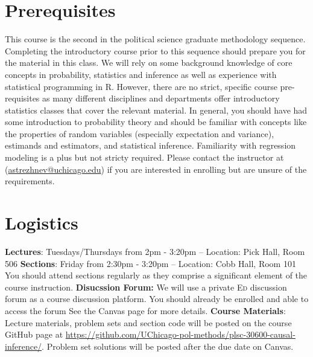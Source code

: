 \documentclass[11pt, article, oneside]{memoir}
\theoremstyle{Assumption}
\begin{document}
\section*{Prerequisites}

This course is the second in the political science graduate methodology sequence. Completing the introductory course prior to this sequence should prepare you for the material in this class. We will rely on some background knowledge of core concepts in probability, statistics and inference as well as experience with statistical programming in R. However, there are no strict, specific course pre-requisites as many different disciplines and departments offer introductory statistics classes that cover the relevant material. In general, you should have had some introduction to probability theory and should be familiar with concepts like the properties of random variables (especially expectation and variance), estimands and estimators, and statistical inference. Familiarity with regression modeling is a plus but not stricty required. Please contact the instructor at (\href{mailto:astrezhnev@uchicago.edu}{astrezhnev@uchicago.edu}) if you are interested in enrolling but are unsure of the requirements. 

\section*{Logistics}

\textbf{Lectures}: Tuesdays/Thursdays from 2pm - 3:20pm -- Location: Pick Hall, Room 506
\newline\textbf{Sections}: Friday from 2:30pm - 3:20pm -- Location: Cobb Hall, Room 101
\newline\newline
You should attend sections regularly as they comprise a significant element of the course instruction.
\newline\newline \textbf{Disucssion Forum:} We will use a private \textsc{Ed} discussion forum as a course discussion platform. You should already be enrolled and able to access the forum  See the Canvas page for more details.
\newline\newline\textbf{Course Materials}: Lecture materials, problem sets and section code will be posted on the course GitHub page at \url{https://github.com/UChicago-pol-methods/plsc-30600-causal-inference/}. Problem set solutions will be posted after the due date on Canvas.
\end{document}
